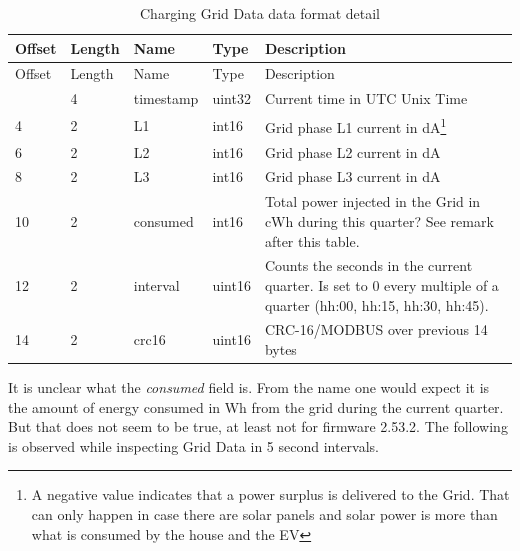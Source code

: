 \documentclass[a4paper]{article}
\begin{document}
\begin{longtable}[]{@{}llllp{10cm}@{}}
	\caption{Charging Grid Data data format detail}
	\label{table.46}
	\tabularnewline
	\toprule\noalign{}
	Offset & Length & Name      & Type   & Description                                                                               \\
	\midrule\noalign{}
	\endfirsthead
	\toprule\noalign{}
	Offset & Length & Name      & Type   & Description                                                                               \\
	\midrule\noalign{}
	\endhead
	\bottomrule\noalign{}
	\endlastfoot
	0      & 4      & timestamp & uint32 & Current time in UTC Unix Time                                                             \\
	4      & 2      & L1        & int16  & Grid phase L1 current in                                                                  
	dA\footnote{\label{fn:negative}A negative value indicates that a power surplus is delivered to the Grid. 
	That can only happen in case there are solar panels and
	solar power is more than what is consumed by the house and the EV} \\
	6      & 2      & L2        & int16  & Grid phase L2 current in dA\footref{fn:negative} \\
	8      & 2      & L3        & int16  & Grid phase L3 current in dA\footref{fn:negative} \\
	10     & 2      & consumed  & int16  & Total power injected in the Grid in cWh during this quarter? See remark after this table. \\
	12     & 2      & interval  & uint16 & Counts the seconds in the current quarter.                                                
	Is set to 0 every multiple of a quarter (hh:00, hh:15, hh:30, hh:45). \\
	14     & 2      & crc16     & uint16 & CRC-16/MODBUS over previous 14 bytes                                                      \\
\end{longtable}
\hfill\break

It is unclear what the \emph{consumed} field is.
From the name one would expect it is the amount of energy consumed in Wh from the grid during the current quarter. 
But that does not seem to be true, at least not for firmware 2.53.2.
The following is observed while inspecting Grid Data in 5 second intervals.
\end{document}
